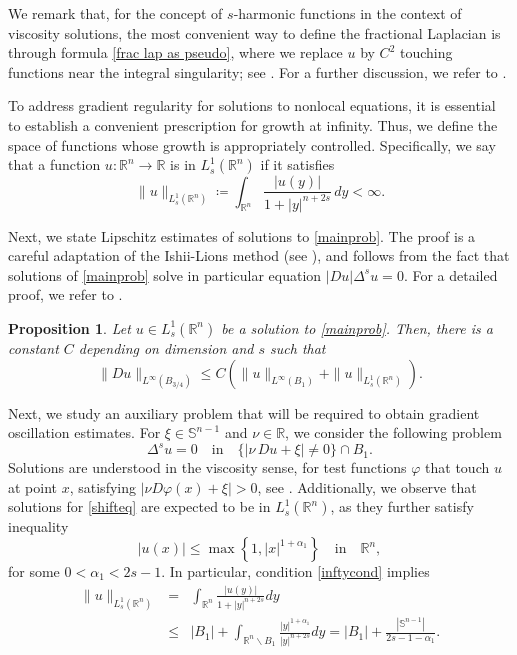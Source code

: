\documentclass[reqno,11pt]{amsart}
\newtheorem{proposition}{Proposition}[section]
\numberwithin{equation}{section}
\numberwithin{equation}{section}
\begin{document}
We remark that, for the concept of $s$-harmonic functions in the context of viscosity solutions, the most convenient way to define the fractional Laplacian is through formula \eqref{frac lap as pseudo}, where we replace $u$ by $C^2$ touching functions near the integral singularity; see \cite[Definition 2.2]{CS09}. For a further discussion, we refer to \cite{BI08}. 

To address gradient regularity for solutions to nonlocal equations, it is essential to establish a convenient prescription for growth at infinity. Thus, we define the space of functions whose growth is appropriately controlled. Specifically, we say that a function \(u \colon \mathbb{R}^n \to \mathbb{R}\) is in \(L^1_s(\mathbb{R}^n)\) if it satisfies
\[
\|u\|_{L^1_s(\mathbb{R}^n)} \coloneqq \int_{\mathbb{R}^n} \frac{|u(y)|}{1 + |y|^{n + 2s}} \, dy < \infty.
\]

Next, we state Lipschitz estimates of solutions to \eqref{mainprob}. The proof is a careful adaptation of the Ishii-Lions method (see \cite{BCI08, BI08, CIL92}), and follows from the fact that solutions of \eqref{mainprob} solve in particular equation $|Du|\Delta^s u = 0$. For a detailed proof, we refer to \cite{PT}.

\begin{proposition}\label{LIPS-VEI-DE-GUERRA}
Let $u \in L^1_s(\mathbb{R}^n)$ be a solution to \eqref{mainprob}. Then, there is a constant $C$ depending on dimension and $s$ such that
$$
    \|Du\|_{L^\infty(B_{3/4})} \leq C(\|u\|_{L^\infty(B_1)} + \|u\|_{L^1_s(\mathbb{R}^n)}).
$$
\end{proposition}

Next, we study an auxiliary problem that will be required to obtain gradient oscillation estimates. For \(\xi \in \mathbb{S}^{n-1}\) and $\nu \in \mathbb{R}$, we consider the following problem
\begin{equation}\label{shifteq}
    \Delta^s u = 0 \quad \text{in} \quad \{ |\nu \, Du + \xi| \neq 0 \} \cap B_1.
\end{equation}
Solutions are understood in the viscosity sense, for test functions $\varphi$ that touch $u$ at point $x$, satisfying $|\nu D\varphi(x)+\xi|>0$, see \cite[Defintion 1.3]{PT}. Additionally, we observe that solutions for \eqref{shifteq} are expected to be in $L^1_s(\mathbb{R}^n)$, as they further satisfy inequality 
\begin{equation}\label{inftycond}
|u(x)| \leq \max\left\{1,|x|^{1+\alpha_1} \right\} \quad \mbox{in} \quad \mathbb{R}^n,
\end{equation}
for some $0 < \alpha_1 < 2s-1$. In particular, condition \eqref{inftycond} implies 
\begin{equation}\label{twohours}
\begin{array}{ccl}
    \|u\|_{L^1_s(\mathbb{R}^n)} & = &  \displaystyle \int_{\mathbb{R}^n}\frac{|u(y)|}{1+|y|^{n+2s}}dy\\ 
    & \leq & |B_1| +  \displaystyle \int_{\mathbb{R}^n \backslash B_1}\frac{|y|^{1+\alpha_1}}{|y|^{n+2s}}dy = |B_1| + \frac{|\mathbb{S}^{n-1}|}{2s - 1 - \alpha_1}.
\end{array}
\end{equation}
\end{document}
